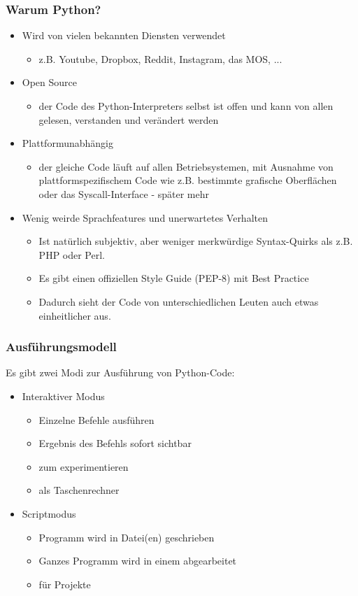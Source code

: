 \documentclass{beamer}
\begin{document}
\begin{frame}
\frametitle {Warum Python?}
\begin{itemize}
	
	\item Wird von vielen bekannten Diensten verwendet 
	\begin{itemize}
		\item z.B. Youtube, Dropbox, Reddit, Instagram, das MOS, ...
	\end{itemize}

	\item Open Source 
	\begin{itemize}
		\item der Code des Python-Interpreters selbst ist offen und kann von allen gelesen, verstanden und verändert werden
	\end{itemize}

	\item Plattformunabhängig 
	\begin{itemize}
		\item der gleiche Code läuft auf allen Betriebsystemen, mit Ausnahme von plattformspezifischem Code wie z.B. bestimmte grafische Oberflächen oder das Syscall-Interface - später mehr
	\end{itemize}
	
	\item Wenig weirde Sprachfeatures und unerwartetes Verhalten
	\begin{itemize}
		\item Ist natürlich subjektiv, aber weniger merkwürdige Syntax-Quirks als z.B. PHP oder Perl.
		\item Es gibt einen offiziellen Style Guide (PEP-8) mit Best Practice
		\item Dadurch sieht der Code von unterschiedlichen Leuten auch etwas einheitlicher aus.
	\end{itemize}

\end{itemize}
\end{frame}

\begin{frame}
\frametitle {Ausführungsmodell}
Es gibt zwei Modi zur Ausführung von Python-Code:
\begin{itemize}
	\item Interaktiver Modus
	\begin{itemize}
		\item Einzelne Befehle ausführen
		\item Ergebnis des Befehls sofort sichtbar
		\item zum experimentieren
		\item als Taschenrechner
	\end{itemize}

	\item Scriptmodus
	\begin{itemize}
		\item Programm wird in Datei(en) geschrieben
		\item Ganzes Programm wird in einem abgearbeitet
		\item für Projekte
	\end{itemize}
\end{itemize}
\end{frame}
\end{document}
